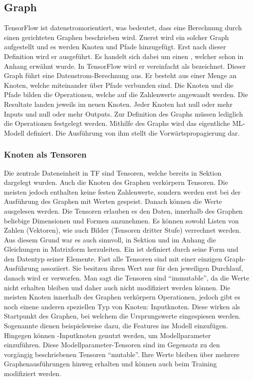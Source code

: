 \subsection{Graph}
TensorFlow ist datenstromorientiert, was bedeutet, dass eine Berechnung
durch einen gerichteten Graphen beschrieben wird. Zuerst wird ein solcher Graph
aufgestellt und es werden Knoten und Pfade hinzugefügt. Erst nach dieser
Definition wird er ausgeführt.
Es handelt sich dabei um einen , welcher schon in
Anhang  erwähnt wurde.
In TensorFlow wird er vereinfacht als  bezeichnet.
\para{}
Dieser Graph führt eine Datenstrom-Berechnung aus.
Er besteht aus einer Menge an Knoten, welche miteinander über Pfade
verbunden sind. Die Knoten und die Pfade bilden die Operationen, welche auf die
Zahlenwerte angewandt werden. Die Resultate landen jeweils im neuen Knoten.
Jeder Knoten hat null oder mehr Inputs und null oder mehr Outputs.
Zur Definition des Graphs müssen lediglich die Operationen festgelegt werden.
\para{}
Mithilfe des Graphs wird das eigentliche ML-Modell definiert. Die Ausführung von
ihm stellt die Vorwärtspropagierung dar.
\para{}


\subsubsection{Knoten als Tensoren}
Die zentrale Dateneinheit in TF sind Tensoren, welche bereits in Sektion
 dargelegt wurden. Auch die Knoten des Graphen
verkörpern Tensoren. Die meisten jedoch enthalten keine festen Zahlenwerte,
sondern werden erst bei der Ausführung des Graphen mit Werten gespeist. Danach können
die Werte ausgelesen werden.
\para{}
Die Tensoren erlauben es den Daten, innerhalb des Graphen beliebige
Dimensionen und Formen anzunehmen. Es können
sowohl Listen von Zahlen (Vektoren), wie auch Bilder (Tensoren dritter Stufe)
verrechnet werden. Aus diesem Grund war es auch sinnvoll, in Sektion
 und im Anhang  die Gleichungen in
Matrixform herzuleiten.
\para{}
Ein  ist definiert durch seine Form und den Datentyp seiner
Elemente. Fast alle Tensoren sind mit einer einzigen Graph-Ausführung
assoziiert. Sie besitzen ihren Wert nur für den jeweiligen Durchlauf, danach wird
er verworfen. Man sagt die Tensoren sind ``immutable'', da die Werte nicht
erhalten bleiben und daher auch nicht modifiziert werden können.
\para{}
Die meisten Knoten innerhalb des Graphen verkörpern Operationen, jedoch gibt es
noch einene anderen speziellen Typ von Knoten: Inputknoten.
Diese wirken als Startpunkt des Graphen, bei welchem die
Ursprungswerte eingespiesen werden.
Sogenannte  dienen beispielsweise dazu, die Features ins Modell einzufügen.
Hingegen können -Inputknoten genutzt werden, um Modellparameter einzuführen.
Diese Modellparameter-Tensoren sind im Gegensatz zu den vorgängig beschriebenen Tensoren
``mutable''. Ihre Werte bleiben über mehrere Graphenausführungen hinweg erhalten und
können auch beim Training modifiziert werden.


